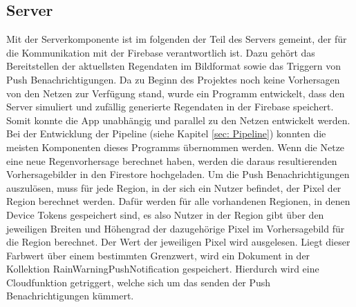 \subsection{Server}\label{server}
\begin{sloppypar}
Mit der Serverkomponente ist im folgenden der Teil des Servers gemeint, der für die Kommunikation mit der Firebase verantwortlich ist. 
Dazu gehört das Bereitstellen der aktuellsten Regendaten im Bildformat sowie das Triggern von Push Benachrichtigungen. 
Da zu Beginn des Projektes noch keine Vorhersagen von den Netzen zur Verfügung stand, wurde ein Programm entwickelt, dass den Server simuliert und zufällig generierte Regendaten in der Firebase speichert. 
Somit konnte die App unabhängig und parallel zu den Netzen entwickelt werden.
Bei der Entwicklung der Pipeline (siehe Kapitel \ref{sec: Pipeline}) konnten die meisten Komponenten dieses Programms übernommen werden. 
Wenn die Netze eine neue Regenvorhersage berechnet haben, werden die daraus resultierenden Vorhersagebilder in den Firestore hochgeladen. 
Um die Push Benachrichtigungen auszulösen, muss für jede Region, in der sich ein Nutzer befindet, der Pixel der Region berechnet werden. 
Dafür werden für alle vorhandenen Regionen, in denen Device Tokens gespeichert sind, es also Nutzer in der Region gibt über den jeweiligen Breiten und Höhengrad der dazugehörige Pixel im Vorhersagebild für die Region berechnet. 
Der Wert der jeweiligen Pixel wird ausgelesen. Liegt dieser Farbwert über einem bestimmten Grenzwert, wird ein Dokument in der Kollektion RainWarningPushNotification gespeichert. 
Hierdurch wird eine Cloudfunktion getriggert, welche sich um das senden der Push Benachrichtigungen kümmert.
\end{sloppypar}